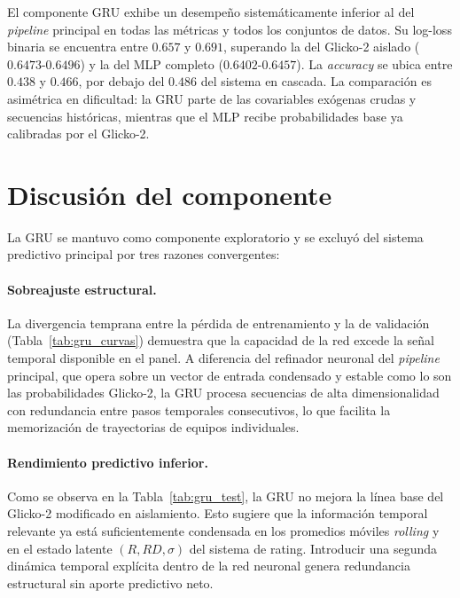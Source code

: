 El componente GRU exhibe un desempe\~no sistem\'aticamente inferior al del \textit{pipeline} principal en todas las m\'etricas y todos los conjuntos de datos. Su log-loss binaria se encuentra entre $0.657$ y $0.691$, superando la del Glicko-2 aislado ($0.6473$-$0.6496$) y la del MLP completo ($0.6402$-$0.6457$). La \textit{accuracy} se ubica entre $0.438$ y $0.466$, por debajo del $0.486$ del sistema en cascada. La comparaci\'on es asim\'etrica en dificultad: la GRU parte de las covariables ex\'ogenas crudas y secuencias hist\'oricas, mientras que el MLP recibe probabilidades base ya calibradas por el Glicko-2.


\section{Discusi\'on del componente}
\label{sec:app_gru_discusion}

La GRU se mantuvo como componente exploratorio y se excluy\'o del sistema predictivo principal por tres razones convergentes:

\paragraph{Sobreajuste estructural.} La divergencia temprana entre la p\'erdida de entrenamiento y la de validaci\'on (Tabla~\ref{tab:gru_curvas}) demuestra que la capacidad de la red excede la se\~nal temporal disponible en el panel. A diferencia del refinador neuronal del \textit{pipeline} principal, que opera sobre un vector de entrada condensado y estable como lo son las probabilidades Glicko-2, la GRU procesa secuencias de alta dimensionalidad con redundancia entre pasos temporales consecutivos, lo que facilita la memorizaci\'on de trayectorias de equipos individuales.

\paragraph{Rendimiento predictivo inferior.} Como se observa en la Tabla~\ref{tab:gru_test}, la GRU no mejora la l\'inea base del Glicko-2 modificado en aislamiento. Esto sugiere que la informaci\'on temporal relevante ya est\'a suficientemente condensada en los promedios m\'oviles \textit{rolling} y en el estado latente $(R,RD,\sigma)$ del sistema de rating. Introducir una segunda din\'amica temporal expl\'icita dentro de la red neuronal genera redundancia estructural sin aporte predictivo neto.

